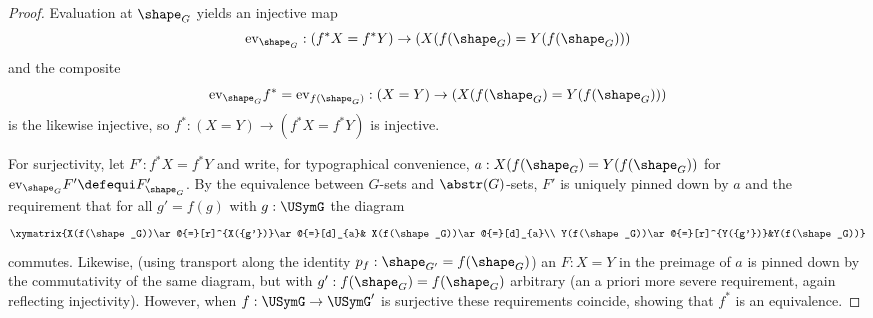 \begin{proof}
  Evaluation at $\shape_G$  yields an injective map
$$\mathrm{ev}_{\shape_G}:(f^*X=f^*Y)\to(X(f(\shape_G)=Y(f(\shape_G)))$$ and the composite
$$\mathrm{ev}_{\shape_G}f^*=\mathrm{ev}_{f(\shape_G)}:(X=Y)\to(X(f(\shape_G)=Y(f(\shape_G)))$$
 is the likewise injective, so $f^*:(X=Y)\to(f^*X=f^*Y)$ is injective.

For surjectivity, let $F':f^*X=f^*Y$ and write, for typographical convenience, $a:X(f(\shape_G)=Y(f(\shape_G))$ for $\mathrm{ev}_{\shape_G}F'\defequi F'_{\shape_G}$.
By the equivalence between $G$-sets and $\abstr(G)$-sets, $F'$ is uniquely pinned down by $a$ and the requirement that for all $g'=f(g)$ with $g:\USymG$ the diagram
$$\xymatrix{X(f(\shape_G))\ar@{=}[r]^{X({g'})}\ar@{=}[d]_{a}&
  X(f(\shape_G))\ar@{=}[d]_{a}\\
  Y(f(\shape_G))\ar@{=}[r]^{Y({g'})}&Y(f(\shape_G))}
$$
commutes.  Likewise, (using transport along the identity $p_f:\shape_{G'}=f(\shape_G)$) an $F:X=Y$ in the preimage of $a$ is pinned down by the commutativity of the same diagram, but with $g':f(\shape_G)=f(\shape_G)$ arbitrary (an a priori more severe requirement, again reflecting injectivity).   However, when $f:\USymG\to\USymG'$ is surjective these requirements coincide, showing that $f^*$ is an equivalence.





\end{proof}

